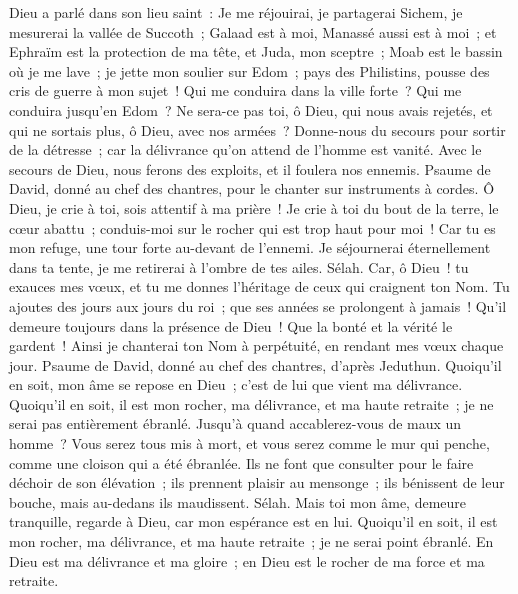 \begin{multicols}{2}
Dieu a parlé dans son lieu saint~: Je me réjouirai, je partagerai Sichem, je mesurerai la vallée de Succoth~;
Galaad est à moi, Manassé aussi est à moi~; et Ephraïm est la protection de ma tête, et Juda, mon sceptre~;
Moab est le bassin où je me lave~; je jette mon soulier sur Edom~; pays des Philistins, pousse des cris de guerre à mon sujet~!
Qui me conduira dans la ville forte~? Qui me conduira jusqu'en Edom~?
Ne sera-ce pas toi, ô Dieu, qui nous avais rejetés, et qui ne sortais plus, ô Dieu, avec nos armées~?
Donne-nous du secours pour sortir de la détresse~; car la délivrance qu'on attend de l'homme est vanité.
Avec le secours de Dieu, nous ferons des exploits, et il foulera nos ennemis.
\VerseOne{}Psaume de David, donné au chef des chantres, pour le chanter sur instruments à cordes.
Ô Dieu, je crie à toi, sois attentif à ma prière~!
Je crie à toi du bout de la terre, le cœur abattu~; conduis-moi sur le rocher qui est trop haut pour moi~!
Car tu es mon refuge, une tour forte au-devant de l'ennemi.
Je séjournerai éternellement dans ta tente, je me retirerai à l'ombre de tes ailes. Sélah.
Car, ô Dieu~! tu exauces mes vœux, et tu me donnes l'héritage de ceux qui craignent ton Nom.
Tu ajoutes des jours aux jours du roi~; que ses années se prolongent à jamais~!
Qu'il demeure toujours dans la présence de Dieu~! Que la bonté et la vérité le gardent~!
Ainsi je chanterai ton Nom à perpétuité, en rendant mes vœux chaque jour.
\VerseOne{}Psaume de David, donné au chef des chantres, d'après Jeduthun.
Quoiqu'il en soit, mon âme se repose en Dieu~; c'est de lui que vient ma délivrance.
Quoiqu'il en soit, il est mon rocher, ma délivrance, et ma haute retraite~; je ne serai pas entièrement ébranlé.
Jusqu'à quand accablerez-vous de maux un homme~? Vous serez tous mis à mort, et vous serez comme le mur qui penche, comme une cloison qui a été ébranlée.
Ils ne font que consulter pour le faire déchoir de son élévation~; ils prennent plaisir au mensonge~; ils bénissent de leur bouche, mais au-dedans ils maudissent. Sélah.
Mais toi mon âme, demeure tranquille, regarde à Dieu, car mon espérance est en lui.
Quoiqu'il en soit, il est mon rocher, ma délivrance, et ma haute retraite~; je ne serai point ébranlé.
En Dieu est ma délivrance et ma gloire~; en Dieu est le rocher de ma force et ma retraite.

\end{multicols}
